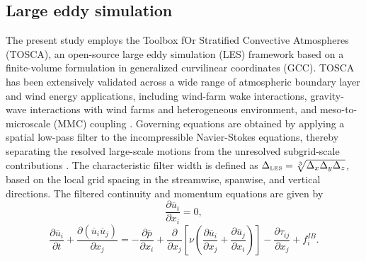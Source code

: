\documentclass[%
superscriptaddress,
 amsmath,amssymb,
pra,
showkeys,
]{revtex4-2}
\begin{document}
\subsection{\label{sec:methodles} Large eddy simulation}
The present study employs the Toolbox fOr Stratified Convective Atmospheres (TOSCA), an open-source large eddy simulation (LES) framework based on a finite-volume formulation in generalized curvilinear coordinates (GCC). TOSCA has been extensively validated across a wide range of atmospheric boundary layer and wind energy applications, including wind-farm wake interactions, gravity-wave interactions with wind farms and heterogeneous environment, and meso-to-microscale (MMC) coupling \cite{stipa2024tosca,stipaafm2024,ajay2025mixed,Ajay2025ProfileAssimilation}. Governing equations are obtained by applying a spatial low-pass filter to the incompressible Navier-Stokes equations, thereby separating the resolved large-scale motions from the unresolved subgrid-scale contributions \cite{sagaut2006large}. The characteristic filter width is defined as $\Delta_{\hbox{\tiny LES}}=\sqrt[3]{\Delta_x\Delta_y\Delta_z}$, based on the local grid spacing in the streamwise, spanwise, and vertical directions. The filtered continuity and momentum equations are given by
\begin{equation}
	\frac{\partial \overline{u}_{i}}{\partial x_i} = 0,
	\label{eq:nseLES1}
\end{equation}
%
\begin{equation}
	\frac{\partial \overline{u}_i}{\partial t}
	+ \frac{\partial \left(\overline{u}_{i}\overline{u}_{j}\right)}{\partial x_j}
	= -\frac{\partial \overline{p}}{\partial x_i}
	+ \frac{\partial}{\partial x_j}
	\left[\nu\left(\frac{\partial \overline{u}_i}{\partial x_j}
	+ \frac{\partial \overline{u}_j}{\partial x_i}\right)\right]
	- \frac{\partial \tau_{ij}}{\partial x_j} + f^{IB}_i.
	\label{eq:nseLES2}
\end{equation}
%
\end{document}
